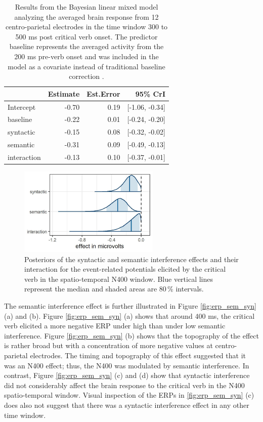 \documentclass[a4paper, man, floatsintext]{apa7}
\begin{document}
\begin{table}[H]
    \caption{Results from the Bayesian linear mixed model analyzing the averaged brain response from 12 centro-parietal electrodes in the time window 300 to 500 ms post critical verb onset. The predictor baseline represents the averaged activity from the 200 ms pre-verb onset and was included in the model as a covariate instead of traditional baseline correction \citep[see][]{alday2019}.}
    \label{tab:eeg_mod}
    \centering
    \begin{tabular}{lrrr}
    \toprule
    & Estimate & Est.Error & 95\% CrI  \\
    \midrule
Intercept &  -0.70 & 0.19 &  [-1.06, -0.34] \\
baseline  &  -0.22 & 0.01 &  [-0.24, -0.20] \\
syntactic &  -0.15 & 0.08 &  [-0.32, -0.02] \\
semantic  &  -0.31 & 0.09 &  [-0.49, -0.13] \\
interaction& -0.13 & 0.10 &  [-0.37, -0.01] \\
    \bottomrule
    \end{tabular}
\end{table}

\begin{figure}[H]
    \caption{Posteriors of the syntactic and semantic interference effects and their interaction for the event-related potentials elicited by the critical verb in the spatio-temporal N400 window. Blue vertical lines represent the median and shaded areas are 80\,\% intervals.}
    \label{fig:eeg_posteriors}
    \centering
    \includegraphics[width=0.6\textwidth]{images/posteriors_eeg.jpg}
\end{figure}


The semantic interference effect is further illustrated in Figure \ref{fig:erp_sem_syn} (a) and (b). Figure \ref{fig:erp_sem_syn} (a) shows that around 400 ms, the critical verb elicited a more negative ERP under high than under low semantic interference. Figure \ref{fig:erp_sem_syn} (b) shows that the topography of the effect is rather broad but with a concentration of more negative values at centro-parietal electrodes. The timing and topography of this effect suggested that it was an N400 effect; thus, the N400 was modulated by semantic interference. In contrast, Figure \ref{fig:erp_sem_syn} (c) and (d) show that syntactic interference did not considerably affect the brain response to the critical verb in the N400 spatio-temporal window. Visual inspection of the ERPs in \ref{fig:erp_sem_syn} (c) does also not suggest that there was a syntactic interference effect in any other time window.
\end{document}
